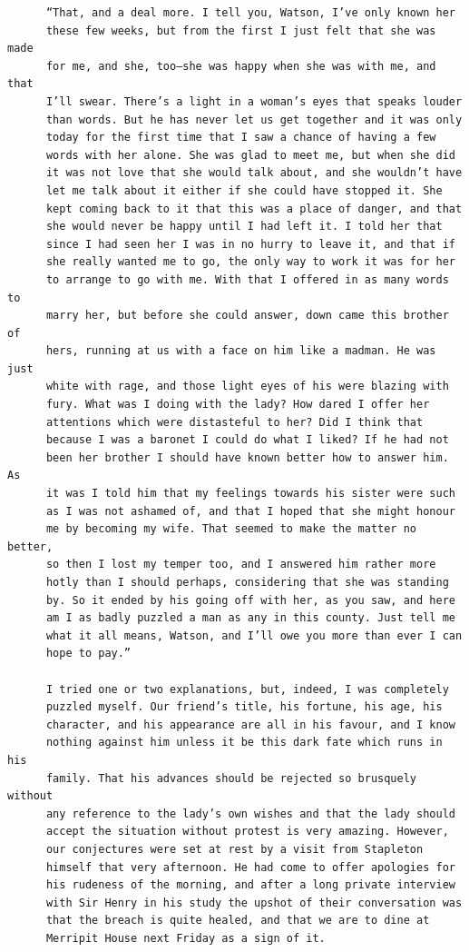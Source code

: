\documentclass{article}
\begin{document}
\begin{verbatim}
      “That, and a deal more. I tell you, Watson, I’ve only known her
      these few weeks, but from the first I just felt that she was made
      for me, and she, too—she was happy when she was with me, and that
      I’ll swear. There’s a light in a woman’s eyes that speaks louder
      than words. But he has never let us get together and it was only
      today for the first time that I saw a chance of having a few
      words with her alone. She was glad to meet me, but when she did
      it was not love that she would talk about, and she wouldn’t have
      let me talk about it either if she could have stopped it. She
      kept coming back to it that this was a place of danger, and that
      she would never be happy until I had left it. I told her that
      since I had seen her I was in no hurry to leave it, and that if
      she really wanted me to go, the only way to work it was for her
      to arrange to go with me. With that I offered in as many words to
      marry her, but before she could answer, down came this brother of
      hers, running at us with a face on him like a madman. He was just
      white with rage, and those light eyes of his were blazing with
      fury. What was I doing with the lady? How dared I offer her
      attentions which were distasteful to her? Did I think that
      because I was a baronet I could do what I liked? If he had not
      been her brother I should have known better how to answer him. As
      it was I told him that my feelings towards his sister were such
      as I was not ashamed of, and that I hoped that she might honour
      me by becoming my wife. That seemed to make the matter no better,
      so then I lost my temper too, and I answered him rather more
      hotly than I should perhaps, considering that she was standing
      by. So it ended by his going off with her, as you saw, and here
      am I as badly puzzled a man as any in this county. Just tell me
      what it all means, Watson, and I’ll owe you more than ever I can
      hope to pay.”

      I tried one or two explanations, but, indeed, I was completely
      puzzled myself. Our friend’s title, his fortune, his age, his
      character, and his appearance are all in his favour, and I know
      nothing against him unless it be this dark fate which runs in his
      family. That his advances should be rejected so brusquely without
      any reference to the lady’s own wishes and that the lady should
      accept the situation without protest is very amazing. However,
      our conjectures were set at rest by a visit from Stapleton
      himself that very afternoon. He had come to offer apologies for
      his rudeness of the morning, and after a long private interview
      with Sir Henry in his study the upshot of their conversation was
      that the breach is quite healed, and that we are to dine at
      Merripit House next Friday as a sign of it.


\end{verbatim}
\end{document}
